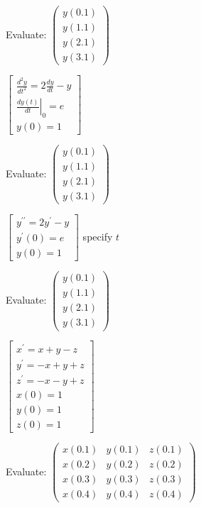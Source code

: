 \documentclass{article}
\begin{document}
Evaluate: $\left( 
\begin{array}{r}
y\left( 0.1\right) \\ 
y\left( 1.1\right) \\ 
y\left( 2.1\right) \\ 
y\left( 3.1\right)%
\end{array}%
\right) $

$\left[ 
\begin{array}{c}
\frac{d^{2}y}{dt^{2}}=2\frac{dy}{dt}-y \\ 
\left. \frac{dy\left( t\right) }{dt}\right\vert _{0}=e \\ 
y\left( 0\right) =1%
\end{array}%
\right] $

Evaluate: $\left( 
\begin{array}{r}
y\left( 0.1\right) \\ 
y\left( 1.1\right) \\ 
y\left( 2.1\right) \\ 
y\left( 3.1\right)%
\end{array}%
\right) $

$\left[ 
\begin{array}{c}
y^{\prime \prime }=2y^{\prime }-y \\ 
y^{\prime }\left( 0\right) =e \\ 
y\left( 0\right) =1%
\end{array}%
\right] $ specify $t$

Evaluate: $\left( 
\begin{array}{r}
y\left( 0.1\right) \\ 
y\left( 1.1\right) \\ 
y\left( 2.1\right) \\ 
y\left( 3.1\right)%
\end{array}%
\right) $

$\left[ 
\begin{array}{r}
x^{\prime }=x+y-z \\ 
y^{\prime }=-x+y+z \\ 
z^{\prime }=-x-y+z \\ 
x(0)=1 \\ 
y(0)=1 \\ 
z(0)=1%
\end{array}%
\right] $

Evaluate: $\left( 
\begin{array}{rrr}
x\left( 0.1\right) & y\left( 0.1\right) & z\left( 0.1\right) \\ 
x\left( 0.2\right) & y\left( 0.2\right) & z\left( 0.2\right) \\ 
x\left( 0.3\right) & y\left( 0.3\right) & z\left( 0.3\right) \\ 
x\left( 0.4\right) & y\left( 0.4\right) & z\left( 0.4\right)%
\end{array}%
\right) $
\end{document}
